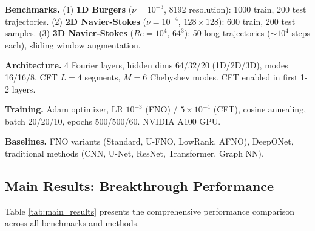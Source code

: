 \documentclass[11pt]{article}
\begin{document}
\textbf{Benchmarks.} (1) \textbf{1D Burgers} ($\nu = 10^{-3}$, 8192 resolution): 1000 train, 200 test trajectories. (2) \textbf{2D Navier-Stokes} ($\nu = 10^{-4}$, $128 \times 128$): 600 train, 200 test samples. (3) \textbf{3D Navier-Stokes} ($Re = 10^4$, $64^3$): 50 long trajectories ($\sim 10^4$ steps each), sliding window augmentation.

\textbf{Architecture.} 4 Fourier layers, hidden dims 64/32/20 (1D/2D/3D), modes 16/16/8, CFT $L=4$ segments, $M=6$ Chebyshev modes. CFT enabled in first 1-2 layers.

\textbf{Training.} Adam optimizer, LR $10^{-3}$ (FNO) / $5 \times 10^{-4}$ (CFT), cosine annealing, batch 20/20/10, epochs 500/500/60. NVIDIA A100 GPU.

\textbf{Baselines.} FNO variants (Standard, U-FNO, LowRank, AFNO), DeepONet, traditional methods (CNN, U-Net, ResNet, Transformer, Graph NN).

\subsection{Main Results: Breakthrough Performance}

Table \ref{tab:main_results} presents the comprehensive performance comparison across all benchmarks and methods.
\end{document}
